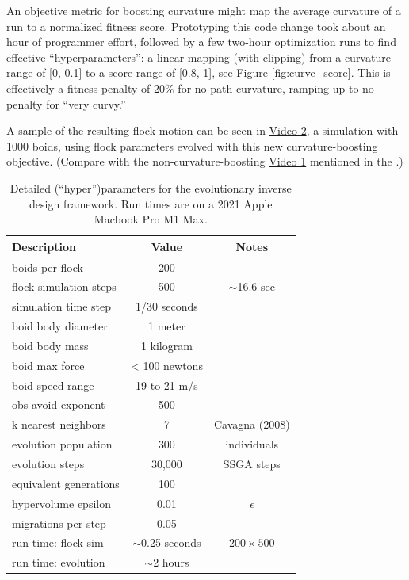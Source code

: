 \documentclass[letterpaper]{article}
\begin{document}
An objective metric for boosting curvature might map the average curvature of a run to a normalized fitness score. Prototyping this code change took about an hour of programmer effort, followed by a few two-hour optimization runs to find effective ``hyperparameters'': a linear mapping (with clipping) from a curvature range of [0, 0.1] to a score range of [0.8, 1], see Figure \ref{fig:curve_score}. This is effectively a fitness penalty of 20\% for no path curvature, ramping up to no penalty for ``very curvy.'' 

A sample of the resulting flock motion can be seen in \href{https://drive.google.com/file/d/1HOeCqkmY__SiON4TCAQyPKa3CviIlPgM/view?usp=sharing}{Video 2}, a simulation with 1000 boids, using flock parameters evolved with this new curvature-boosting objective. (Compare with the non-curvature-boosting \href{https://drive.google.com/file/d/1ZbanvWVfapnH2TpTqamypWFoXuMeoY9b/view?usp=sharing}{Video 1} mentioned in the .)


\begin{table}[]
\centering
\begin{tabular}{ | l | c | c | }
    \hline
    \textbf{Description} & \textbf{Value} & \textbf{Notes} \\
    \hline
    boids per flock & 200 &  \\
    flock simulation steps & 500 & $\sim$16.6 sec \\
    simulation time step & 1/30 seconds & \\
    \hline
    boid body diameter & 1 meter & \\
    boid body mass & 1 kilogram & \\
    boid max force & < 100 newtons & \\
    boid speed range & 19 to 21 m/s & \\
    obs avoid exponent & 500 & \\
    k nearest neighbors & 7 & Cavagna (2008) \\
    \hline
    evolution population & 300 & individuals \\
    evolution steps & 30,000 &  SSGA steps \\
    equivalent generations & 100 & \\
    hypervolume epsilon & 0.01 & $\epsilon$ \\
    migrations per step & 0.05 &  \\
    \hline
    run time: flock sim & $\sim$0.25 seconds & $200{\times}500$ \\
    run time: evolution & $\sim$2 hours & \\
    \hline
\end{tabular}
\caption{Detailed (``hyper'')parameters for the evolutionary inverse design framework. Run times are on a 2021 Apple Macbook Pro M1 Max.}
\label{table:HyperParameters}
\end{table}
\end{document}
